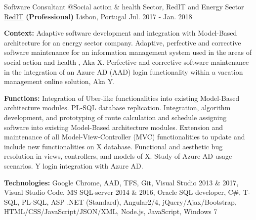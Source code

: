 \begin{cventries}
  \cventry
    {Software Consultant @Social action \& health Sector, %
    RedIT and 
    Energy Sector %
    } %
    {\href{https://www.reditpro.com/}{RedIT} \textbf{(Professional)}} %
    {Lisbon, Portugal} %
    {Jul. 2017 - Jan. 2018} 
    {
      \begin{cvitems} %
		\item[] {\textbf{Context:} 
Adaptive software development and integration with Model-Based architecture for an energy sector company. %
Adaptive, perfective and corrective software maintenance for an information management system used in the areas of social action and health%
, Aka X.
Perfective and corrective software maintenance in the integration of an Azure AD (AAD) login functionality within a vacation management online solution, Aka Y.}
		\item[] {\textbf{Functions:} Integration of Uber-like functionalities into existing Model-Based architecture modules. PL-SQL database replication. Integration, algorithm development, and prototyping of route calculation and schedule assigning software into existing Model-Based architecture modules.
		Extension and maintenance of all Model-View-Controller (MVC) functionalities to update and include new functionalities on X database. Functional and aesthetic bug resolution in views, controllers, and models of X.
		Study of Azure AD usage scenarios. Y login integration with Azure AD.}		
		\item[] {\textbf{Technologies:} 
		\textcolor{rainbowcolor-olive}{Google Chrome}, 
		\textcolor{rainbowcolor-olive}{AAD}, 
		\textcolor{rainbowcolor-olive}{TFS}, 
		\textcolor{rainbowcolor-olive}{Git}, 
		\textcolor{rainbowcolor-olive}{Visual Studio 2013 \& 2017},
		\textcolor{rainbowcolor-olive}{Visual Studio Code}, 
		\textcolor{rainbowcolor-olive}{MS SQL-server 2014 \& 2016},
		\textcolor{rainbowcolor-olive}{Oracle SQL developer},
		\textcolor{rainbowcolor-indigo}{C\#}, 
		\textcolor{rainbowcolor-indigo}{T-SQL},
		\textcolor{rainbowcolor-indigo}{PL-SQL}, 
		\textcolor{rainbowcolor-indigo}{ASP .NET (Standard)}, 
		\textcolor{rainbowcolor-indigo}{Angular2/4}, 
		\textcolor{rainbowcolor-indigo}{jQuery/Ajax/Bootstrap},		
		\textcolor{rainbowcolor-indigo}{HTML/CSS/JavaScript/JSON/XML}, 
		\textcolor{rainbowcolor-indigo}{Node.js}, 
		\textcolor{rainbowcolor-indigo}{JavaScript}, 
		\textcolor{rainbowcolor-orange}{Windows 7}}	
      \end{cvitems}
    } 
    

\end{cventries}
